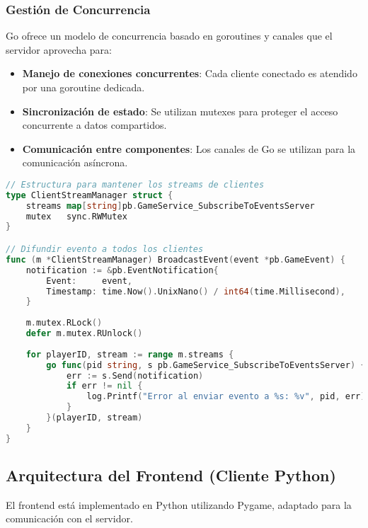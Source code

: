 \documentclass[11pt,letterpaper]{article}
\begin{document}
\subsubsection{Gestión de Concurrencia}

Go ofrece un modelo de concurrencia basado en goroutines y canales que el servidor aprovecha para:

\begin{itemize}
    \item \textbf{Manejo de conexiones concurrentes}: Cada cliente conectado es atendido por una goroutine dedicada.
    
    \item \textbf{Sincronización de estado}: Se utilizan mutexes para proteger el acceso concurrente a datos compartidos.
    
    \item \textbf{Comunicación entre componentes}: Los canales de Go se utilizan para la comunicación asíncrona.
\end{itemize}

\begin{lstlisting}[language=go, caption=Gestión de streams de clientes]
// Estructura para mantener los streams de clientes
type ClientStreamManager struct {
    streams map[string]pb.GameService_SubscribeToEventsServer
    mutex   sync.RWMutex
}

// Difundir evento a todos los clientes
func (m *ClientStreamManager) BroadcastEvent(event *pb.GameEvent) {
    notification := &pb.EventNotification{
        Event:     event,
        Timestamp: time.Now().UnixNano() / int64(time.Millisecond),
    }
    
    m.mutex.RLock()
    defer m.mutex.RUnlock()
    
    for playerID, stream := range m.streams {
        go func(pid string, s pb.GameService_SubscribeToEventsServer) {
            err := s.Send(notification)
            if err != nil {
                log.Printf("Error al enviar evento a %s: %v", pid, err)
            }
        }(playerID, stream)
    }
}
\end{lstlisting}

\subsection{Arquitectura del Frontend (Cliente Python)}

El frontend está implementado en Python utilizando Pygame, adaptado para la comunicación con el servidor.
\end{document}

